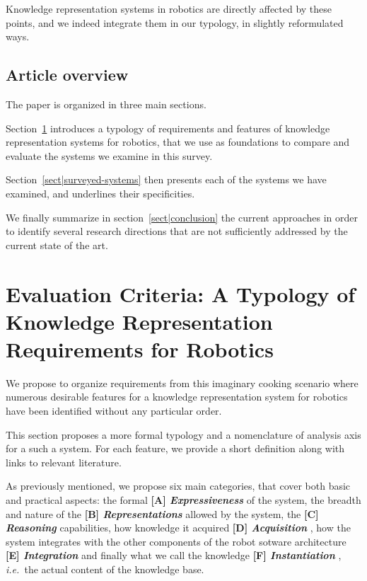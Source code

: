 \documentclass{IEEEtran}
\newcommand{\ie}{{\textit{i.e.\ }}}
\newcommand{\taxon}[2]{%
    \textbf{[#1] \emph{#2}}
}
\begin{document}
Knowledge representation systems in robotics are directly affected by these
points, and we indeed integrate them in our typology, in slightly reformulated
ways.

\subsection{Article overview}
\label{sect|overview}

The paper is organized in three main sections.

Section~\ref{sect|features} introduces a typology of requirements and features
of knowledge representation systems for robotics, that we use as foundations to
compare and evaluate the systems we examine in this survey.

Section~\ref{sect|surveyed-systems} then presents each of the systems we have
examined, and underlines their specificities.

We finally summarize in section~\ref{sect|conclusion} the current approaches in
order to identify several research directions that are not sufficiently
addressed by the current state of the art.

\section{Evaluation Criteria: A Typology of Knowledge Representation Requirements for Robotics}
\label{sect|features}

We propose to organize requirements from this imaginary cooking scenario where
numerous desirable features for a knowledge representation system for robotics
have been identified without any particular order.

This section proposes a more formal typology and a nomenclature of analysis
axis for a such a system. For each feature, we provide a short definition along
with links to relevant literature.

As previously mentioned, we propose six main categories, that cover both basic
and practical aspects: the formal
\taxon{A}{Expressiveness} of the system, the breadth and nature
of the \taxon{B}{Representations} allowed by the system, the
\taxon{C}{Reasoning} capabilities, how knowledge it acquired
\taxon{D}{Acquisition}, how the system integrates with the other components of
the robot sotware architecture \taxon{E}{Integration} and finally what we call
the knowledge \taxon{F}{Instantiation}, \ie the actual content of the knowledge
base.
\end{document}
